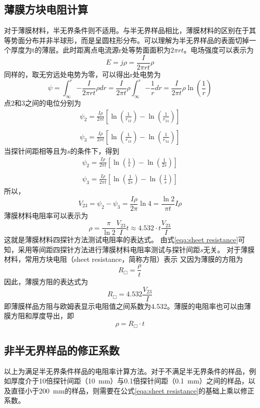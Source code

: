\documentclass[12pt]{ctexart}
\begin{document}
\subsection{薄膜方块电阻计算}
对于薄膜材料，半无界条件则不适用。与半无界样品相比，薄膜材料的区别在于其等势面分布并非半球形，而是呈圆柱形分布。可以理解为半无界样品的表面切掉一个厚度为t的薄层。此时距离点电流源r处等势面面积为$2\pi rt$。电场强度可以表示为
\[E = j\rho  = \frac{I}{{2\pi rt}}\rho \]
同样的，取无穷远处电势为零，可以得出r处电势为
\[\psi  = \int_\infty ^r { - \frac{I}{{2\pi rt}}\rho dr}  = \frac{I}{{2\pi t}}\rho \int_\infty ^r { - \frac{1}{r}dr}  = \frac{I}{{2\pi t}}\rho \ln (\frac{1}{r})\]
点2和3之间的电位分别为
\[\begin{array}{l}
	{\psi _2} = \frac{{I\rho }}{{2\pi t}}\left[ {\ln \left( {\frac{1}{{{r_{12}}}}} \right) - \ln \left( {\frac{1}{{{r_{24}}}}} \right)} \right]\\\\
	{\psi _3} = \frac{{I\rho }}{{2\pi t}}\left[ {\ln \left( {\frac{1}{{{r_{13}}}}} \right) - \ln \left( {\frac{1}{{{r_{34}}}}} \right)} \right]
\end{array}\]
当探针间距相等且为$s$的条件下，得到
\[\begin{array}{l}
	{\psi _2} = \frac{{I\rho }}{{2\pi t}}\left[ {\ln \left( {\frac{1}{s}} \right) - \ln \left( {\frac{1}{2s}} \right)} \right]\\\\
	{\psi _3} = \frac{{I\rho }}{{2\pi t}}\left[ {\ln \left( {\frac{1}{2s}} \right) - \ln \left( {\frac{1}{s}} \right)} \right]
\end{array}\]
所以，
\[{V_{23}} = {\psi _2} - {\psi _3}= \frac{{I\rho }}{{2\pi }}\ln 4 = \frac{{\ln 2}}{{\pi t}}I\rho \]
薄膜材料电阻率可以表示为
\begin{equation}\label{eqa:sheet resistance}
\rho  = \frac{\pi }{{\ln 2}}\frac{{{V_{23}}}}{I} t \approx 4.532\cdot t\frac{{{V_{23}}}}{I}
\end{equation}
这就是薄膜材料四探针方法测试电阻率的表达式。
由式\ref{eqa:sheet resistance}可知，采用等间距四探针方法进行薄膜材料电阻率测试与探针间距$s$无关。
对于薄膜材料，常用方块电阻（sheet resistance，简称方阻）表示
又因为薄膜的方阻为
\[{R_{\Box}}=\frac{\rho}{t}\] 
因此，薄膜方阻的表达式为
\[{R_{\Box}} = 4.532\frac{{{V_{23}}}}{I}\]
即薄膜样品方阻与欧姆表显示电阻值之间系数为4.532。薄膜的电阻率也可以由薄膜方阻和厚度导出，即
\[\rho={R_{\Box}\cdot t}\]\label{eqa:sheet resistance to resistivity}


\newpage
\subsection{非半无界样品的修正系数}
以上为满足半无界条件样品的电阻率计算方法。对于不满足半无界条件的样品，例如厚度介于10倍探针间距（10\ mm）与0.1倍探针间距（0.1\ mm）之间的样品，以及直径小于200\ mm的样品，则需要在公式\ref{eqa:sheet resistance}的基础上乘以修正系数。
\end{document}
